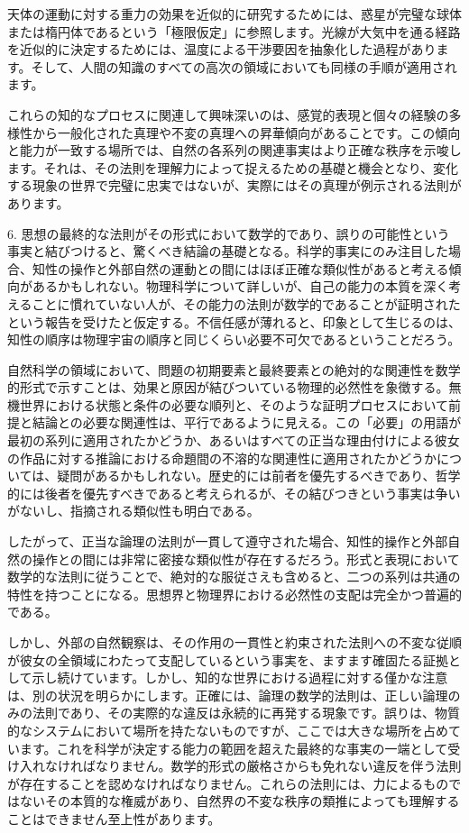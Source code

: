 \documentclass[a4paper,11pt,openany]{ltjsbook}
\begin{document}
天体の運動に対する重力の効果を近似的に研究するためには、惑星が完璧な球体または楕円体であるという「極限仮定」に参照します。光線が大気中を通る経路を近似的に決定するためには、温度による干渉要因を抽象化した過程があります。そして、人間の知識のすべての高次の領域においても同様の手順が適用されます。

これらの知的なプロセスに関連して興味深いのは、感覚的表現と個々の経験の多様性から一般化された真理や不変の真理への昇華傾向があることです。この傾向と能力が一致する場所では、自然の各系列の関連事実はより正確な秩序を示唆します。それは、その法則を理解力によって捉えるための基礎と機会となり、変化する現象の世界で完璧に忠実ではないが、実際にはその真理が例示される法則があります。

6. 思想の最終的な法則がその形式において数学的であり、誤りの可能性という事実と結びつけると、驚くべき結論の基礎となる。科学的事実にのみ注目した場合、知性の操作と外部自然の運動との間にはほぼ正確な類似性があると考える傾向があるかもしれない。物理科学について詳しいが、自己の能力の本質を深く考えることに慣れていない人が、その能力の法則が数学的であることが証明されたという報告を受けたと仮定する。不信任感が薄れると、印象として生じるのは、知性の順序は物理宇宙の順序と同じくらい必要不可欠であるということだろう。

自然科学の領域において、問題の初期要素と最終要素との絶対的な関連性を数学的形式で示すことは、効果と原因が結びついている物理的必然性を象徴する。無機世界における状態と条件の必要な順列と、そのような証明プロセスにおいて前提と結論との必要な関連性は、平行であるように見える。この「必要」の用語が最初の系列に適用されたかどうか、あるいはすべての正当な理由付けによる彼女の作品に対する推論における命題間の不溶的な関連性に適用されたかどうかについては、疑問があるかもしれない。歴史的には前者を優先するべきであり、哲学的には後者を優先すべきであると考えられるが、その結びつきという事実は争いがないし、指摘される類似性も明白である。

したがって、正当な論理の法則が一貫して遵守された場合、知性的操作と外部自然の操作との間には非常に密接な類似性が存在するだろう。形式と表現において数学的な法則に従うことで、絶対的な服従さえも含めると、二つの系列は共通の特性を持つことになる。思想界と物理界における必然性の支配は完全かつ普遍的である。

しかし、外部の自然観察は、その作用の一貫性と約束された法則への不変な従順が彼女の全領域にわたって支配しているという事実を、ますます確固たる証拠として示し続けています。しかし、知的な世界における過程に対する僅かな注意は、別の状況を明らかにします。正確には、論理の数学的法則は、正しい論理のみの法則であり、その実際的な違反は永続的に再発する現象です。誤りは、物質的なシステムにおいて場所を持たないものですが、ここでは大きな場所を占めています。これを科学が決定する能力の範囲を超えた最終的な事実の一端として受け入れなければなりません。数学的形式の厳格さからも免れない違反を伴う法則が存在することを認めなければなりません。これらの法則には、力によるものではないその本質的な権威があり、自然界の不変な秩序の類推によっても理解することはできません至上性があります。
\end{document}
